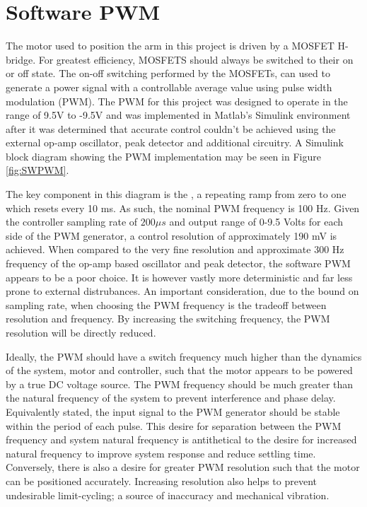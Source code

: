 \section{Software PWM}
\label{sec:swpwm}

The motor used to position the arm in this project is driven by a MOSFET H-bridge.
For greatest efficiency, MOSFETS should always be switched to their on or off state. 
The on-off switching performed by the MOSFETs, can used to generate a power signal with a controllable average value using pulse width modulation (PWM).
The PWM for this project was designed to operate in the range of 9.5V to -9.5V and was implemented in Matlab’s Simulink environment after it was determined that accurate control couldn’t be achieved using the external op-amp oscillator, peak detector and additional circuitry.
A Simulink block diagram showing the PWM implementation may be seen in Figure \ref{fig:SWPWM}.

The key component in this diagram is the , a repeating ramp from zero to one which resets every 10 ms.
As such, the nominal PWM frequency is 100 Hz.
Given the controller sampling rate of $200 \mu s$ and output range of 0-9.5 Volts for each side %
of the PWM generator, a control resolution of approximately 190 mV is achieved.
When compared to the very fine resolution and approximate 300 Hz frequency of the op-amp based oscillator and peak detector, the software PWM appears to be a poor choice.
It is however vastly more deterministic and far less prone to external distrubances.
An important consideration, due to the bound on sampling rate, when choosing the PWM frequency is the tradeoff between resolution and frequency. 
By increasing the switching frequency, the PWM resolution will be directly reduced.

Ideally, the PWM should have a switch frequency much higher than the dynamics of the system, motor and controller, such that the motor appears to be powered by a true DC voltage source.
The PWM frequency should be much greater than the natural frequency of the system to prevent interference and phase delay. 
Equivalently stated, the input signal to the PWM generator should be stable within the period of each pulse.
This desire for separation between the PWM frequency and system natural frequency is antithetical to the desire for increased natural frequency to improve system response and reduce settling time.
Conversely, there is also a desire for greater PWM resolution such that the motor can be positioned accurately.
Increasing resolution also helps to prevent undesirable limit-cycling; a source of inaccuracy and mechanical vibration.

